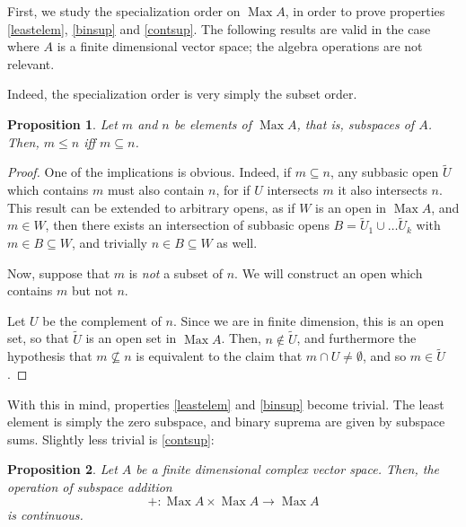 \documentclass{article}
\theoremstyle{plain}
\newtheorem{prop}{Proposition}
\theoremstyle{nonumberplain}
\newtheorem{proof}{Proof}
\DeclareMathOperator{\Max}{Max}
\begin{document}
First, we study the specialization order on $\Max A$, in order to prove properties \ref{leastelem}, \ref{binsup} and \ref{contsup}. The following results are valid in the case where $A$ is a finite dimensional vector space; the algebra operations are not relevant.

Indeed, the specialization order is very simply the subset order.

\begin{prop}
Let $m$ and $n$ be elements of $\Max A$, that is, subspaces of $A$. Then, $m \leq n$ iff $m \subseteq n$.
\end{prop}

\begin{proof}
One of the implications is obvious. Indeed, if $m \subseteq n$, any subbasic open $\tilde U$ which contains $m$ must also contain $n$, for if $U$ intersects $m$ it also intersects $n$. This result can be extended to arbitrary opens, as if $W$ is an open in $\Max A$, and $m \in W$, then there exists an intersection of subbasic opens $B = \tilde U_1 \cup \dots \tilde U_k$ with $m \in B \subseteq W$, and trivially $n \in B \subseteq W$ as well.

Now, suppose that $m$ is \emph{not} a subset of $n$. We will construct an open which contains $m$ but not $n$.

Let $U$ be the complement of $n$. Since we are in finite dimension, this is an open set, so that $\tilde U$ is an open set in $\Max A$. Then, $n \not \in \tilde U$, and furthermore the hypothesis that $m \nsubseteq n$ is equivalent to the claim that $m \cap U \neq \emptyset$, and so $m \in \tilde U$.
\end{proof}

With this in mind, properties \ref{leastelem} and \ref{binsup} become trivial. The least element is simply the zero subspace, and binary suprema are given by subspace sums. Slightly less trivial is \ref{contsup}:

\begin{prop}
Let $A$ be a finite dimensional complex vector space. Then, the operation of subspace addition
\[ + \colon \Max A \times \Max A \to \Max A\]
is continuous.
\end{prop}
\end{document}
